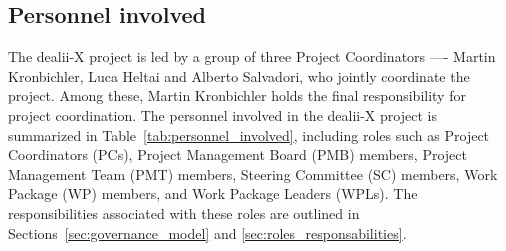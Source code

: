 \documentclass[a4paper,12pt]{article}
\begin{document}
\subsection{\textcolor{EUblue}{Personnel involved}}

The dealii-X project is led by a group of three Project Coordinators ---- Martin Kronbichler, Luca Heltai and Alberto Salvadori, who jointly coordinate the project. Among these, Martin Kronbichler holds the final responsibility for project coordination. The personnel involved in the dealii-X project is summarized in Table~\ref{tab:personnel_involved}, including roles such as Project Coordinators (PCs), Project Management Board (PMB) members, Project Management Team (PMT) members, Steering Committee (SC) members, Work Package (WP) members, and Work Package Leaders (WPLs). The responsibilities associated with these roles are outlined in Sections~\ref{sec:governance_model} and \ref{sec:roles_responsabilities}.



\end{document}
